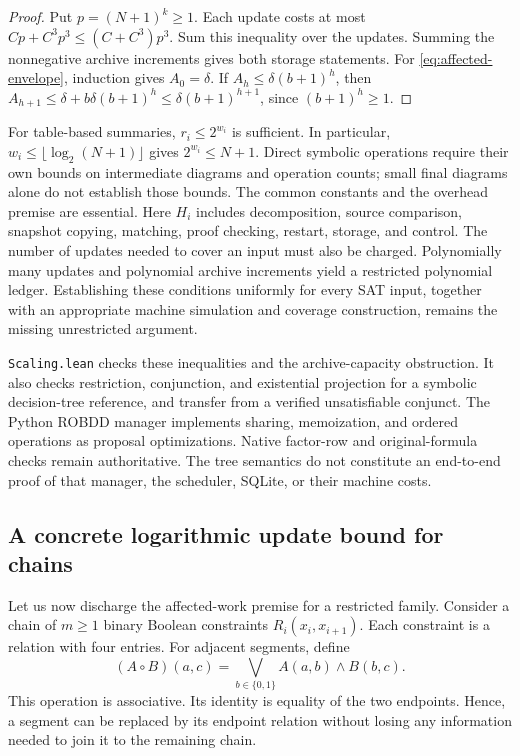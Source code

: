 \documentclass[11pt,a4paper]{article}
\numberwithin{equation}{section}
\newcommand{\bits}{\{0,1\}}
\theoremstyle{plain}
\theoremstyle{definition}
\theoremstyle{remark}
\begin{document}
\begin{proof}
Put $p=(N+1)^k\geq1$. Each update costs at most $Cp+C^3p^3\leq(C+C^3)p^3$. Sum this inequality over the updates. Summing the nonnegative archive increments gives both storage statements. For \eqref{eq:affected-envelope}, induction gives $A_0=\delta$. If $A_h\leq\delta(b+1)^h$, then $A_{h+1}\leq\delta+b\delta(b+1)^h\leq\delta(b+1)^{h+1}$, since $(b+1)^h\geq1$.
\end{proof}

For table-based summaries, $r_i\leq2^{w_i}$ is sufficient. In particular, $w_i\leq\lfloor\log_2(N+1)\rfloor$ gives $2^{w_i}\leq N+1$. Direct symbolic operations require their own bounds on intermediate diagrams and operation counts; small final diagrams alone do not establish those bounds. The common constants and the overhead premise are essential. Here $H_i$ includes decomposition, source comparison, snapshot copying, matching, proof checking, restart, storage, and control. The number of updates needed to cover an input must also be charged. Polynomially many updates and polynomial archive increments yield a restricted polynomial ledger. Establishing these conditions uniformly for every SAT input, together with an appropriate machine simulation and coverage construction, remains the missing unrestricted argument.

\texttt{Scaling.lean} checks these inequalities and the archive-capacity obstruction. It also checks restriction, conjunction, and existential projection for a symbolic decision-tree reference, and transfer from a verified unsatisfiable conjunct. The Python ROBDD manager implements sharing, memoization, and ordered operations as proposal optimizations. Native factor-row and original-formula checks remain authoritative. The tree semantics do not constitute an end-to-end proof of that manager, the scheduler, SQLite, or their machine costs.

\subsection{A concrete logarithmic update bound for chains}
\label{sec:balanced-chain}

Let us now discharge the affected-work premise for a restricted family. Consider a chain of $m\geq1$ binary Boolean constraints $R_i(x_i,x_{i+1})$. Each constraint is a relation with four entries. For adjacent segments, define
\begin{equation}
(A\circ B)(a,c)=\bigvee_{b\in\bits} A(a,b)\land B(b,c).
\label{eq:chain-compose}
\end{equation}
This operation is associative. Its identity is equality of the two endpoints. Hence, a segment can be replaced by its endpoint relation without losing any information needed to join it to the remaining chain.
\end{document}
